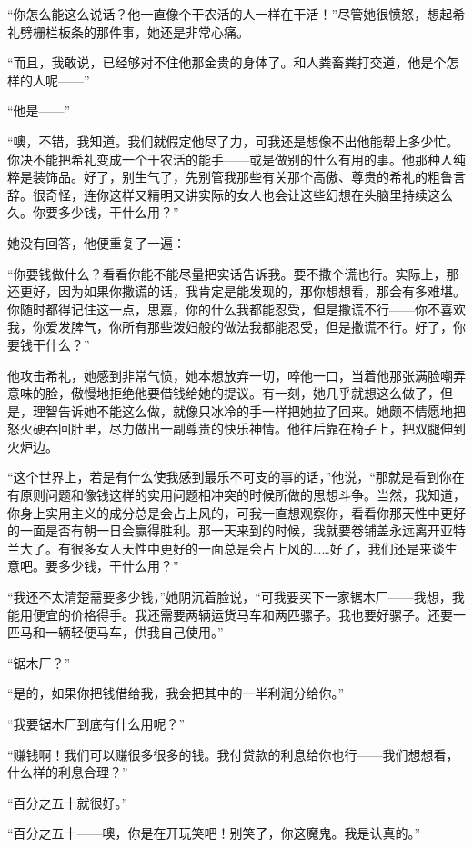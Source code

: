 \par “你怎么能这么说话？他一直像个干农活的人一样在干活！”尽管她很愤怒，想起希礼劈栅栏板条的那件事，她还是非常心痛。
\par “而且，我敢说，已经够对不住他那金贵的身体了。和人粪畜粪打交道，他是个怎样的人呢——”
\par “他是——”
\par “噢，不错，我知道。我们就假定他尽了力，可我还是想像不出他能帮上多少忙。你决不能把希礼变成一个干农活的能手——或是做别的什么有用的事。他那种人纯粹是装饰品。好了，别生气了，先别管我那些有关那个高傲、尊贵的希礼的粗鲁言辞。很奇怪，连你这样又精明又讲实际的女人也会让这些幻想在头脑里持续这么久。你要多少钱，干什么用？”
\par 她没有回答，他便重复了一遍：
\par “你要钱做什么？看看你能不能尽量把实话告诉我。要不撒个谎也行。实际上，那还更好，因为如果你撒谎的话，我肯定是能发现的，那你想想看，那会有多难堪。你随时都得记住这一点，思嘉，你的什么我都能忍受，但是撒谎不行——你不喜欢我，你爱发脾气，你所有那些泼妇般的做法我都能忍受，但是撒谎不行。好了，你要钱干什么？”
\par 他攻击希礼，她感到非常气愤，她本想放弃一切，啐他一口，当着他那张满脸嘲弄意味的脸，傲慢地拒绝他要借钱给她的提议。有一刻，她几乎就想这么做了，但是，理智告诉她不能这么做，就像只冰冷的手一样把她拉了回来。她颇不情愿地把怒火硬吞回肚里，尽力做出一副尊贵的快乐神情。他往后靠在椅子上，把双腿伸到火炉边。
\par “这个世界上，若是有什么使我感到最乐不可支的事的话，”他说，“那就是看到你在有原则问题和像钱这样的实用问题相冲突的时候所做的思想斗争。当然，我知道，你身上实用主义的成分总是会占上风的，可我一直想观察你，看看你那天性中更好的一面是否有朝一日会赢得胜利。那一天来到的时候，我就要卷铺盖永远离开亚特兰大了。有很多女人天性中更好的一面总是会占上风的……好了，我们还是来谈生意吧。要多少钱，干什么用？”
\par “我还不太清楚需要多少钱，”她阴沉着脸说，“可我要买下一家锯木厂——我想，我能用便宜的价格得手。我还需要两辆运货马车和两匹骡子。我也要好骡子。还要一匹马和一辆轻便马车，供我自己使用。”
\par “锯木厂？”
\par “是的，如果你把钱借给我，我会把其中的一半利润分给你。”
\par “我要锯木厂到底有什么用呢？”
\par “赚钱啊！我们可以赚很多很多的钱。我付贷款的利息给你也行——我们想想看，什么样的利息合理？”
\par “百分之五十就很好。”
\par “百分之五十——噢，你是在开玩笑吧！别笑了，你这魔鬼。我是认真的。”
